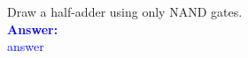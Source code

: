 \item{}
Draw a half-adder using only NAND gates.\\[12pt]
\ifanswers
\textcolor{blue}{
\textbf{Answer:}\\
answer
}
\newpage
\fi

